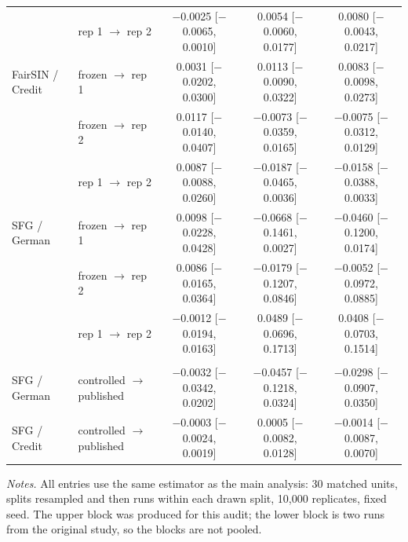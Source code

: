 \begin{table}[t]
\begin{tabular}{llccc}
 & rep 1 \(\rightarrow\) rep 2 & $-$0.0025 [$-$0.0065, 0.0010] & 0.0054 [$-$0.0060, 0.0177] & 0.0080 [$-$0.0043, 0.0217] \\
\addlinespace[2pt]
FairSIN / Credit & frozen \(\rightarrow\) rep 1 & 0.0031 [$-$0.0202, 0.0300] & 0.0113 [$-$0.0090, 0.0322] & 0.0083 [$-$0.0098, 0.0273] \\
 & frozen \(\rightarrow\) rep 2 & 0.0117 [$-$0.0140, 0.0407] & $-$0.0073 [$-$0.0359, 0.0165] & $-$0.0075 [$-$0.0312, 0.0129] \\
 & rep 1 \(\rightarrow\) rep 2 & 0.0087 [$-$0.0088, 0.0260] & $-$0.0187 [$-$0.0465, 0.0036] & $-$0.0158 [$-$0.0388, 0.0033] \\
\addlinespace[2pt]
SFG / German & frozen \(\rightarrow\) rep 1 & 0.0098 [$-$0.0228, 0.0428] & $-$0.0668 [$-$0.1461, 0.0027] & $-$0.0460 [$-$0.1200, 0.0174] \\
 & frozen \(\rightarrow\) rep 2 & 0.0086 [$-$0.0165, 0.0364] & $-$0.0179 [$-$0.1207, 0.0846] & $-$0.0052 [$-$0.0972, 0.0885] \\
 & rep 1 \(\rightarrow\) rep 2 & $-$0.0012 [$-$0.0194, 0.0163] & 0.0489 [$-$0.0696, 0.1713] & 0.0408 [$-$0.0703, 0.1514] \\
\addlinespace[2pt]
\midrule
\multicolumn{5}{l}{\textit{Frozen pairs reclassified as re-execution}} \\
\addlinespace[1pt]
SFG / German & controlled \(\rightarrow\) published & $-$0.0032 [$-$0.0342, 0.0202] & $-$0.0457 [$-$0.1218, 0.0324] & $-$0.0298 [$-$0.0907, 0.0350] \\
SFG / Credit & controlled \(\rightarrow\) published & $-$0.0003 [$-$0.0024, 0.0019] & 0.0005 [$-$0.0082, 0.0128] & $-$0.0014 [$-$0.0087, 0.0070] \\
\bottomrule
\end{tabular}

\vspace{2pt}
\begin{minipage}{0.96\columnwidth}
\footnotesize
\textit{Notes.}
All entries use the same estimator as the main analysis: 30 matched units, splits resampled and then runs within each drawn split, 10{,}000 replicates, fixed seed.
The upper block was produced for this audit; the lower block is two runs from the original study, so the blocks are not pooled.
\end{minipage}
\end{table}
